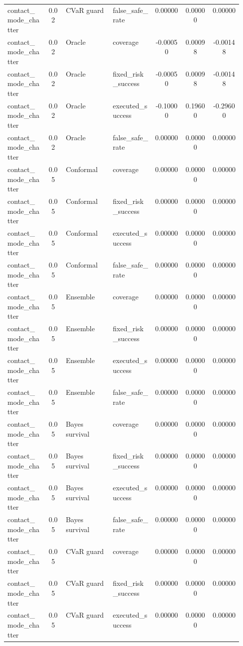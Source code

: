 \documentclass{article}
\begin{document}
\begin{center}
\begin{longtable}{p{0.17\linewidth}cp{0.20\linewidth}p{0.18\linewidth}ccc}
contact\_mode\_chatter & 0.02 & CVaR guard & false\_safe\_rate & 0.00000 & 0.00000 & 0.00000\\
contact\_mode\_chatter & 0.02 & Oracle & coverage & -0.00050 & 0.00098 & -0.00148\\
contact\_mode\_chatter & 0.02 & Oracle & fixed\_risk\_success & -0.00050 & 0.00098 & -0.00148\\
contact\_mode\_chatter & 0.02 & Oracle & executed\_success & -0.10000 & 0.19600 & -0.29600\\
contact\_mode\_chatter & 0.02 & Oracle & false\_safe\_rate & 0.00000 & 0.00000 & 0.00000\\
contact\_mode\_chatter & 0.05 & Conformal & coverage & 0.00000 & 0.00000 & 0.00000\\
contact\_mode\_chatter & 0.05 & Conformal & fixed\_risk\_success & 0.00000 & 0.00000 & 0.00000\\
contact\_mode\_chatter & 0.05 & Conformal & executed\_success & 0.00000 & 0.00000 & 0.00000\\
contact\_mode\_chatter & 0.05 & Conformal & false\_safe\_rate & 0.00000 & 0.00000 & 0.00000\\
contact\_mode\_chatter & 0.05 & Ensemble & coverage & 0.00000 & 0.00000 & 0.00000\\
contact\_mode\_chatter & 0.05 & Ensemble & fixed\_risk\_success & 0.00000 & 0.00000 & 0.00000\\
contact\_mode\_chatter & 0.05 & Ensemble & executed\_success & 0.00000 & 0.00000 & 0.00000\\
contact\_mode\_chatter & 0.05 & Ensemble & false\_safe\_rate & 0.00000 & 0.00000 & 0.00000\\
contact\_mode\_chatter & 0.05 & Bayes survival & coverage & 0.00000 & 0.00000 & 0.00000\\
contact\_mode\_chatter & 0.05 & Bayes survival & fixed\_risk\_success & 0.00000 & 0.00000 & 0.00000\\
contact\_mode\_chatter & 0.05 & Bayes survival & executed\_success & 0.00000 & 0.00000 & 0.00000\\
contact\_mode\_chatter & 0.05 & Bayes survival & false\_safe\_rate & 0.00000 & 0.00000 & 0.00000\\
contact\_mode\_chatter & 0.05 & CVaR guard & coverage & 0.00000 & 0.00000 & 0.00000\\
contact\_mode\_chatter & 0.05 & CVaR guard & fixed\_risk\_success & 0.00000 & 0.00000 & 0.00000\\
contact\_mode\_chatter & 0.05 & CVaR guard & executed\_success & 0.00000 & 0.00000 & 0.00000\\

\end{longtable}
\end{center}
\end{document}

